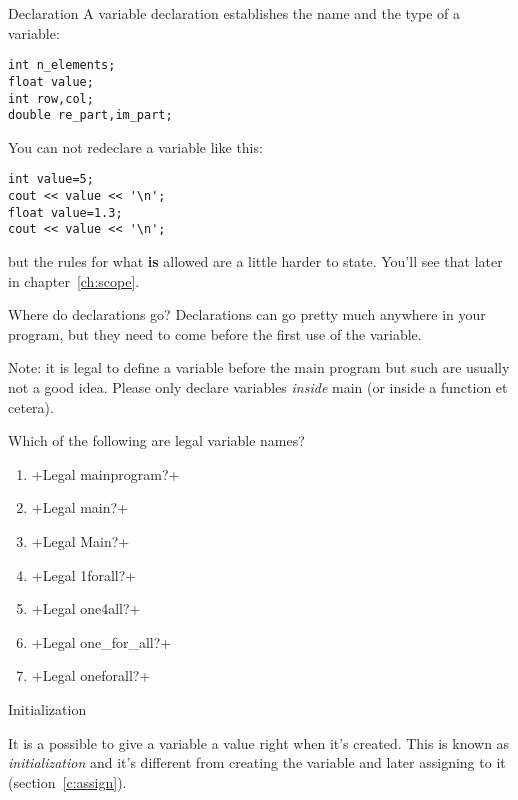 \begin{block}{Declaration}
  \label{sl:declare-example}
  A variable declaration establishes the name
  and the type of a variable:
\begin{lstlisting}
int n_elements;
float value;
int row,col;
double re_part,im_part;
\end{lstlisting}
\end{block}

You can not redeclare a variable like this:
\begin{lstlisting}
int value=5;
cout << value << '\n';
float value=1.3;
cout << value << '\n';
\end{lstlisting}
but the rules for what \textbf{is} allowed are a little harder to state.
You'll see that later in chapter~\ref{ch:scope}.

\begin{block}{Where do declarations go?}
  \label{sl:declwhere}
  Declarations can go pretty much anywhere in your program, but they need
  to come before the first use of the variable.

  Note: it is legal to define a variable before the main program
  but such  are usually not a good idea.
  Please only declare variables \emph{inside} main
  (or inside a function et cetera).
\end{block}

\begin{review}
  \label{q:varnames}
  Which of the following are legal variable names?
  \begin{enumerate}
  \item {}
    \slackpollTF+Legal mainprogram?+
  \item {}
    \slackpollTF+Legal main?+
  \item {}
    \slackpollTF+Legal Main?+
  \item {}
    \slackpollTF+Legal 1forall?+
  \item {}
    \slackpollTF+Legal one4all?+
  \item {}
    \slackpollTF+Legal one_for_all?+
  \item {}
    \slackpollTF+Legal onefor{all}?+
  \end{enumerate}
\end{review}

 {Initialization}
\label{sec:varinit}

It is a possible to give a variable a value right when it's
created. This is known as
\emph{initialization} and it's
different from creating the variable and later assigning to it
(section~\ref{c:assign}).

